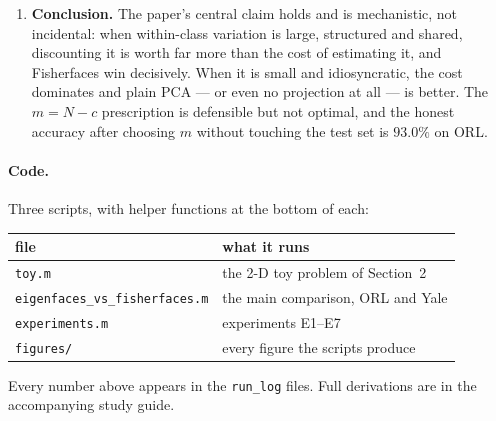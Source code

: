 \documentclass[11pt]{article}
\begin{document}
\begin{enumerate}[leftmargin=1.3em,itemsep=2pt]
\item \textbf{Conclusion.} The paper's central claim holds and is
mechanistic, not incidental: when within-class variation is large, structured
and shared, discounting it is worth far more than the cost of estimating it,
and Fisherfaces win decisively. When it is small and idiosyncratic, the cost
dominates and plain PCA --- or even no projection at all --- is better. The
$m=N-c$ prescription is defensible but not optimal, and the honest accuracy
after choosing $m$ without touching the test set is $93.0\%$ on ORL.
\end{enumerate}

\paragraph{Code.} Three scripts, with helper functions at the bottom of each:

\begin{center}\small
\begin{tabular}{ll}
\toprule
file & what it runs \\
\midrule
\texttt{toy.m} & the 2-D toy problem of Section~2 \\
\texttt{eigenfaces\_vs\_fisherfaces.m} & the main comparison, ORL and Yale \\
\texttt{experiments.m} & experiments E1--E7 \\
\texttt{figures/} & every figure the scripts produce \\
\bottomrule
\end{tabular}
\end{center}

Every number above appears in the \texttt{run\_log} files. Full
derivations are in the accompanying study guide.
\end{document}

